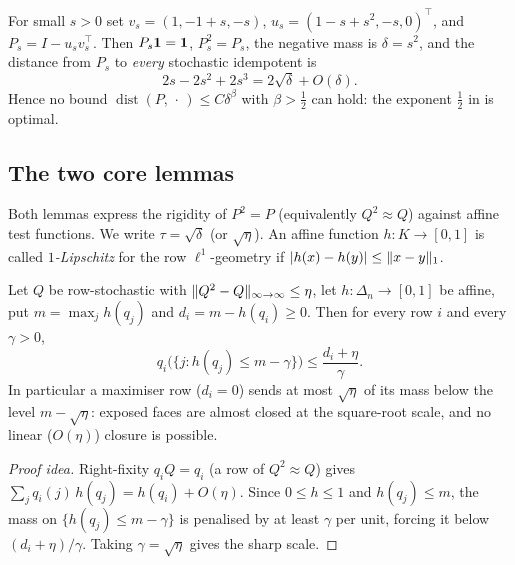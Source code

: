\begin{example}\label{ex:hume}
For small $s>0$ set $v_s=(1,-1+s,-s)$, $u_s=(1-s+s^2,-s,0)^{\!\top}$, and
$P_s=I-u_sv_s^{\!\top}$. Then $P_s\mathbf{1}=\mathbf{1}$, $P_s^2=P_s$, the negative mass is
$\delta=s^2$, and the distance from $P_s$ to \emph{every} stochastic idempotent
is
\[
  2s-2s^2+2s^3=2\sqrt{\delta}+O(\delta).
\]
Hence no bound $\operatorname{dist}(P,\,\cdot\,)\le C\delta^{\beta}$ with
$\beta>\tfrac12$ can hold: the exponent $\tfrac12$ in
 is optimal.
\end{example}

\subsection{The two core lemmas}

Both lemmas express the rigidity of $P^2=P$ (equivalently $Q^2\approx Q$) against
affine test functions. We write $\tau=\sqrt{\delta}$ (or $\sqrt\eta$). An affine
function $h\colon K\to[0,1]$ is called \emph{$1$-Lipschitz} for the row
$\ell^1$-geometry if $\lvert h(x)-h(y)\rvert\le\lVert x-y \rVert_1$.

\begin{lemma}\label{lem:leakage}
Let $Q$ be row-stochastic with $\lVert Q^2-Q \rVert_{\infty\to\infty}\le\eta$, let
$h\colon\Delta_n\to[0,1]$ be affine, put $m=\max_j h(q_j)$ and
$d_i=m-h(q_i)\ge0$. Then for every row $i$ and every $\gamma>0$,
\[
  q_i\bigl(\{j:h(q_j)\le m-\gamma\}\bigr)\le\frac{d_i+\eta}{\gamma}.
\]
In particular a maximiser row ($d_i=0$) sends at most $\sqrt\eta$ of its mass
below the level $m-\sqrt\eta$: exposed faces are almost closed at the
square-root scale, and no linear ($O(\eta)$) closure is possible.
\end{lemma}

\begin{proof}[Proof idea]
Right-fixity $q_iQ=q_i$ (a row of $Q^2\approx Q$) gives
$\sum_j q_i(j)\,h(q_j)=h(q_i)+O(\eta)$. Since $0\le h\le1$ and $h(q_j)\le m$, the
mass on $\{h(q_j)\le m-\gamma\}$ is penalised by at least $\gamma$ per unit,
forcing it below $(d_i+\eta)/\gamma$. Taking $\gamma=\sqrt\eta$ gives the sharp
scale.
\end{proof}

